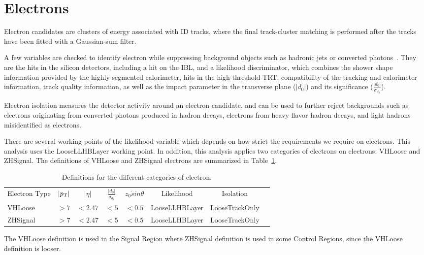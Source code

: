 \section{Electrons}
\label{sec:el}
\par Electron candidates are clusters of energy associated with ID tracks, 
where the final track-cluster matching is performed after the tracks have been fitted with a Gaussian-sum filter.
\par A few variables are checked to identify electron while suppressing background objects 
such as hadronic jets or converted photons~\cite{ATL-PHYS-PUB-2015-041}. 
They are the hits in the silicon detectors, including a hit on the IBL, and a likelihood discriminator, 
which combines the shower shape information provided by the highly segmented calorimeter, hits in the high-threshold TRT, 
compatibility of the tracking and calorimeter information, track quality information, 
as well as the impact parameter in the transverse plane ($|d_0|$) and its significance ($\frac{|d_0|}{\sigma_{d_0}}$).
\par Electron isolation measures the detector activity around an electron candidate, 
and can be used to further reject backgrounds such as electrons originating from converted photons produced in hadron decays, 
electrons from heavy flavor hadron decays, and light hadrons misidentified as electrons.
\par There are several working points of the likelihood variable which depends on how strict the requirements we require on electrons. 
This analysis uses the LooseLLHBLayer working point. In addition, this analysis applies two categories of electrons on electrons:
VHLoose and ZHSignal. The definitions of VHLoose and ZHSignal electrons are summarized in Table~\ref{tab:el}.
\begin{table}[tbh]
\centering
\tiny

\begin{tabular}{|l|c|c|c|c|c|c|c}

\hline
Electron Type & $|p_{\mathrm{T}}|$ & $|\eta|$ & $\frac{|d_0|}{\sigma_{d_0}}$ & $z_0\dot sin\theta$ & Likelihood & Isolation \\
VHLoose &$>7$&$<2.47$&$<5$&$<0.5$&LooseLLHBLayer&LooseTrackOnly\\
ZHSignal&$>7$&$<2.47$&$<5$&$<0.5$&LooseLLHBLayer&LooseTrackOnly\\
\hline

\end{tabular}
\caption{Definitions for the different categories of electron.}
\label{tab:el}
\end{table}
\par The VHLoose definition is used in the Signal Region where ZHSignal definition is used in some Control Regions, since the VHLoose definition is looser.
 
